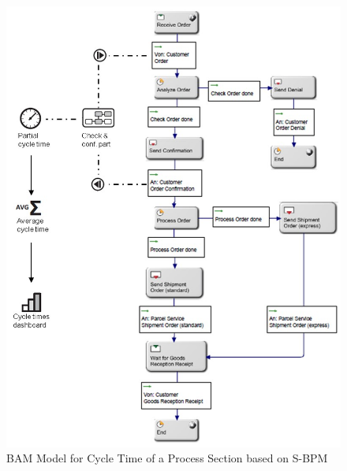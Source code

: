 \begin{figure}[h]
	\centering
	\includegraphics[width=0.9\linewidth]{Figures/Chapter5/BAM-Model-for-Cycle-Time-of-a-Process-Section-based-on-S-BPM.jpg}
	\caption[BAM Model for Cycle Time of a Process Section based on S-BPM]{BAM Model for Cycle Time of a Process Section based on S-BPM}
	\label{fig:BAM-Cycle-Time}
\end{figure}

